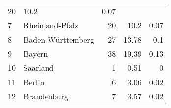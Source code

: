 \begin{longtable}{lXrrr}
       \num{20} &
       \num[round-mode=places,round-precision=2]{10.2} &
         \num[round-mode=places,round-precision=2]{0.07} \\

     7 &
     \multicolumn{1}{X}{ Rheinland-Pfalz   } &


       \num{20} &
       \num[round-mode=places,round-precision=2]{10.2} &
         \num[round-mode=places,round-precision=2]{0.07} \\

     8 &
     \multicolumn{1}{X}{ Baden-Württemberg   } &


       \num{27} &
       \num[round-mode=places,round-precision=2]{13.78} &
         \num[round-mode=places,round-precision=2]{0.1} \\

     9 &
     \multicolumn{1}{X}{ Bayern   } &


       \num{38} &
       \num[round-mode=places,round-precision=2]{19.39} &
         \num[round-mode=places,round-precision=2]{0.13} \\

     10 &
     \multicolumn{1}{X}{ Saarland   } &


       \num{1} &
       \num[round-mode=places,round-precision=2]{0.51} &
         \num[round-mode=places,round-precision=2]{0} \\

     11 &
     \multicolumn{1}{X}{ Berlin   } &


       \num{6} &
       \num[round-mode=places,round-precision=2]{3.06} &
         \num[round-mode=places,round-precision=2]{0.02} \\

     12 &
     \multicolumn{1}{X}{ Brandenburg   } &


       \num{7} &
       \num[round-mode=places,round-precision=2]{3.57} &
         \num[round-mode=places,round-precision=2]{0.02} \\


\end{longtable}
